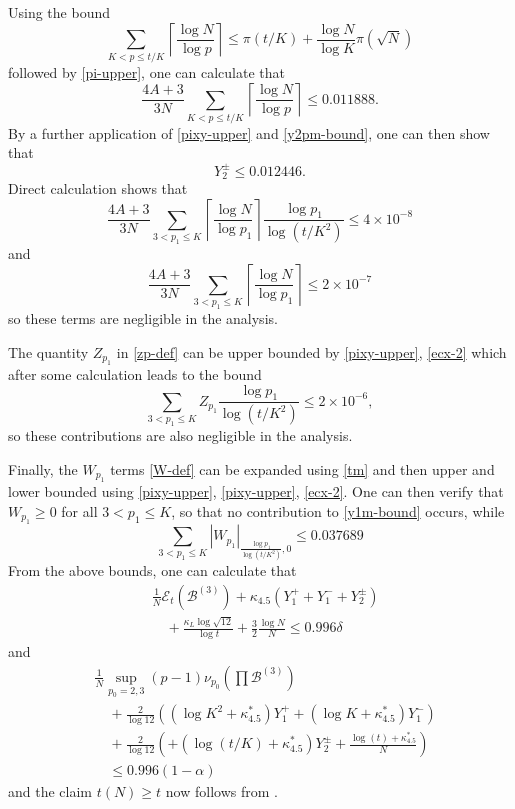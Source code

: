 \documentclass[12pt,a4paper,reqno]{amsart}
\numberwithin{equation}{section}
\theoremstyle{plain}
\theoremstyle{definition}
\newcommand\tuple{{\mathcal B}}
\newcommand\excess{{\mathcal{E}}}
\begin{document}
Using the bound
$$ \sum_{K < p \leq t/K} \left\lceil \frac{\log N}{\log p} \right\rceil \leq \pi(t/K) + \frac{\log N}{\log K} \pi(\sqrt{N})$$
followed by \eqref{pi-upper}, one can calculate that
$$ \frac{4A+3}{3N} \sum_{K < p \leq t/K} \left\lceil \frac{\log N}{\log p}\right\rceil \leq 0.011888.$$
By a further application of \eqref{pixy-upper} and \eqref{y2pm-bound}, one can then show that
$$ Y^\pm_2 \leq 0.012446.$$
Direct calculation shows that
$$ \frac{4A+3}{3N} \sum_{3 < p_1 \leq K} \left\lceil \frac{\log N}{\log p_1} \right\rceil \frac{\log p_1}{\log(t/K^2)} \leq 4 \times 10^{-8}$$
and
$$ \frac{4A+3}{3N} \sum_{3 < p_1 \leq K} \left\lceil \frac{\log N}{\log p_1} \right\rceil \leq 2 \times 10^{-7}$$
so these terms are negligible in the analysis. 

The quantity $Z_{p_1}$ in \eqref{zp-def} can be upper bounded by \eqref{pixy-upper}, \eqref{ecx-2} which after some calculation leads to the bound
$$ \sum_{3 < p_1 \leq K} Z_{p_1} \frac{\log p_1}{\log(t/K^2)} \leq 2 \times 10^{-6},$$
so these contributions are also negligible in the analysis.

Finally, the $W_{p_1}$ terms \eqref{W-def} can be expanded using \eqref{tm} and then upper and lower bounded using \eqref{pixy-upper}, \eqref{pixy-upper}, \eqref{ecx-2}.  One can then verify that $W_{p_1} \geq 0$ for all $3 < p_1 \leq K$, so that no contribution to \eqref{y1m-bound} occurs, while
$$ \sum_{3 < p_1 \leq K} |W_{p_1}|_{\frac{\log p_1}{\log (t/K^2)}, 0} \leq 0.037689$$
From the above bounds, one can calculate that
\begin{align*}
&  \frac{1}{N} \excess_t(\tuple^{(3)}) + \kappa_{4.5}(Y_1^+ + Y_1^- + Y_2^\pm) \\
&\quad + \frac{\kappa_L \log \sqrt{12}}{\log t} + \frac{3}{2} \frac{\log N}{N} \leq 0.996 \delta
\end{align*}
and
\begin{align*}
  &\frac{1}{N} \sup_{p_0=2,3} (p-1) \nu_{p_0}\left(\prod \tuple^{(3)}\right) \\
  &\quad + \frac{2}{\log 12} \left( (\log K^2 +\kappa^*_{4.5}) Y_1^+ + (\log K + \kappa^*_{4.5}) Y_1^- \right) \\
  &\quad + \frac{2}{\log 12} \left(  + (\log(t/K) +\kappa^*_{4.5}) Y_2^\pm + \frac{\log(t) + \kappa^*_{4.5}}{N}  \right)
  \\
    &\quad  \leq 0.996 (1-\alpha) 
\end{align*}
and the claim $t(N) \geq t$ now follows from .

\appendix
\end{document}
